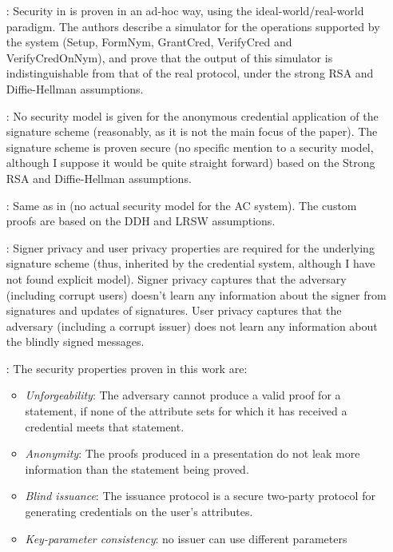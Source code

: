 \begin{enumerate}
\item[\cite{cl01}:] Security in \cite{cl01} is proven in an ad-hoc way,
  using the ideal-world/real-world paradigm. The authors describe a
  simulator for the operations supported by the system (Setup, FormNym,
  GrantCred, VerifyCred and VerifyCredOnNym), and prove that the output of this
  simulator is indistinguishable from that of the real protocol, under the
  strong RSA and Diffie-Hellman assumptions.  
\item[\cite{cl02}:] No security model is given for the anonymous credential
  application of the signature scheme (reasonably, as it is not the main focus
  of the paper). The signature scheme is proven secure (no specific mention
  to a security model, although I suppose it would be quite straight forward)
  based on the Strong RSA and Diffie-Hellman assumptions.
\item[\cite{cl04}:] Same as in \cite{cl02} (no actual security model for the
  AC system). The custom proofs are based on the DDH and LRSW assumptions.
\item[\cite{cks10}:] Signer privacy and user privacy properties are required
  for the underlying signature scheme (thus, inherited by the credential system,
  although I have not found explicit model). Signer privacy captures that the
  adversary (including corrupt users) doesn't learn any information about the
  signer from signatures and updates of signatures. User privacy captures that
  the adversary (including a corrupt issuer) does not learn any information
  about the blindly signed messages. 
\item[\cite{cmz14}:] The security properties proven in this work are:
  \begin{itemize}
  \item \emph{Unforgeability}: The adversary cannot produce a valid proof for a
    statement, if none of the attribute sets for which it has received a
    credential meets that statement.
  \item \emph{Anonymity}: The proofs produced in a presentation do not leak
    more information than the statement being proved.
  \item \emph{Blind issuance}: The issuance protocol is a secure two-party
    protocol for generating credentials on the user's attributes.
  \item \emph{Key-parameter consistency}: no issuer can use different parameters

\end{itemize}
\end{enumerate}
